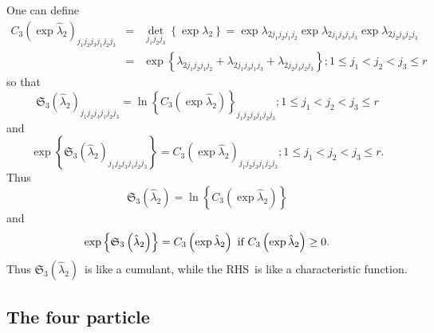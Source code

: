 \documentclass[12pt]{article}
\begin{document}
One can define 
\begin{eqnarray*}
C_{3}\left( \exp \hat{\lambda}_{2}\right) _{j_{1}j_{2}j_{3}j_{1}j_{2}j_{3}}
&=&\det_{j_{1}j_{2}j_{3}}\left\{ \exp \lambda _{2}\right\} =\exp \lambda
_{2j_{1}j_{2}j_{1}j_{2}}\exp \lambda _{2j_{1}j_{3}j_{1}j_{3}}\exp \lambda
_{2j_{2}j_{3}j_{2}j_{3}} \\
&=&\exp \left\{ \lambda _{2j_{1}j_{2}j_{1}j_{2}}+\lambda
_{2j_{1}j_{3}j_{1}j_{3}}+\lambda _{2j_{2}j_{3}j_{2}j_{3}}\right\} ;1\leq
j_{1}<j_{2}<j_{3}\leq r
\end{eqnarray*}%
so that%
\begin{equation*}
\mathfrak{S}_{3}\left( \hat{\lambda}_{2}\right)
_{j_{1}j_{2}j_{3}j_{1}j_{2}j_{3}}=\ln \left\{ C_{3}\left( \exp \hat{\lambda}%
_{2}\right) \right\} _{j_{1}j_{2}j_{3}j_{1}j_{2}j_{3}};1\leq
j_{1}<j_{2}<j_{3}\leq r
\end{equation*}%
and 
\begin{equation*}
\exp \left\{ \mathfrak{S}_{3}\left( \hat{\lambda}_{2}\right)
_{j_{1}j_{2}j_{3}j_{1}j_{2}j_{3}}\right\} =C_{3}\left( \exp \hat{\lambda}%
_{2}\right) _{j_{1}j_{2}j_{3}j_{1}j_{2}j_{3}};1\leq j_{1}<j_{2}<j_{3}\leq r.
\end{equation*}%
Thus 
\begin{equation*}
\mathfrak{S}_{3}\left( \hat{\lambda}_{2}\right) =\ln \left\{ C_{3}\left(
\exp \hat{\lambda}_{2}\right) \right\}
\end{equation*}%
and 
\begin{equation*}
\exp \left\{ \mathfrak{S}_{3}\left( \hat{\lambda}_{2}\right) \right\}
=C_{3}\left( \exp \hat{\lambda}_{2}\right) \text{ if }C_{3}\left( \exp \hat{%
\lambda}_{2}\right) \geq 0.
\end{equation*}%
Thus $\mathfrak{S}_{3}\left( \hat{\lambda}_{2}\right) $\ is like a cumulant,
while the RHS\ is like a characteristic function.

\subsection{The four particle}
\end{document}
